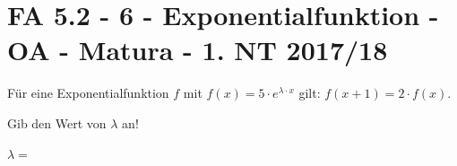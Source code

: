 \section{FA 5.2 - 6 - Exponentialfunktion - OA - Matura - 1. NT 2017/18}

\begin{beispiel}[FA 5.2]{1}
Für eine Exponentialfunktion $f$ mit $f(x)=5\cdot e^{\lambda\cdot x}$ gilt: $f(x+1)=2\cdot f(x)$.

Gib den Wert von $\lambda$ an!\leer

$\lambda=$\,
\end{beispiel}